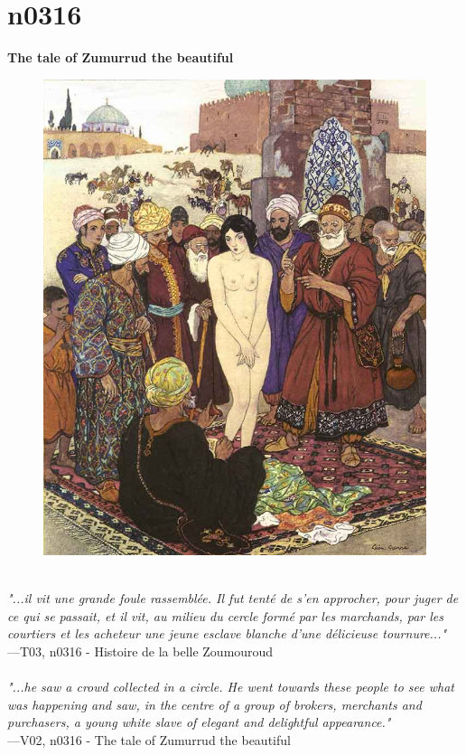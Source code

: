\documentclass[../Carre_nights.tex]{subfiles}
\begin{document}
\newpage

\section{n0316}
\textbf{\Large{The tale of Zumurrud the beautiful}} \\

\begin{figure}[ht]
\centering
\includegraphics[height=\figsize]{illustrations/volume_3/T03, n0316 - Histoire de la belle Zoumouroud.jpg}
\end{figure}

\textit{\\
"...il vit une grande foule rassemblée. Il fut tenté de s’en approcher, pour juger de ce qui se passait, et il vit, au milieu du cercle formé par les marchands, par les courtiers et les acheteur une jeune esclave blanche d’une délicieuse tournure..."} \\
—T03, n0316 - Histoire de la belle Zoumouroud \\~\\
\textit{"...he saw a crowd collected in a circle. He went towards these people to see what was happening and saw, in the centre of a group of brokers, merchants and purchasers, a young white slave of elegant and delightful appearance."} \\
—V02, n0316 - The tale of Zumurrud the beautiful
\end{document}
